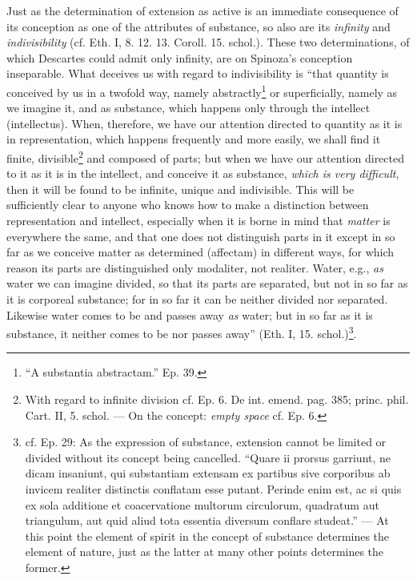 \documentclass[12pt,a4paper,openany]{book}
\newcommand{\opage}[1]{\marginnote{\footnotesize\textit{[#1]}}}
\begin{document}
\opage{75}\setcounter{footnote}{0}Just as the determination of extension as active is an immediate
consequence of its conception as one of the attributes of substance,
so also are its \emph{infinity} and \emph{indivisibility} (cf. Eth. I, 8.
12. 13. Coroll. 15. schol.). These two determinations, of which
Descartes could admit only infinity, are on Spinoza's
conception inseparable. What deceives us with regard to indivisibility
is ``that quantity is conceived by us in a twofold
way, namely abstractly\footnote{``A substantia abstractam.'' Ep.
39.} or superficially, namely as we imagine it, and
as substance, which happens only through the intellect (intellectus).
When, therefore, we have our attention directed to quantity
as it is in representation, which happens frequently and
more easily, we shall find it finite, divisible\footnote{With
regard to infinite division cf. Ep. 6. De int. emend. pag.
385; princ. phil. Cart. II, 5. schol. --- On the concept: \emph{empty
space} cf. Ep. 6.} and composed of parts; but when we have
our attention directed to it as it is in the intellect,
and conceive it as substance, \emph{which is very difficult}, then
it will be found to be infinite, unique and indivisible. This will
be sufficiently clear to anyone who knows how to make a
distinction between representation and intellect, especially when it is
borne in mind that \emph{matter} is everywhere the same, and that one does not
distinguish parts in it except in so far as we conceive matter
as determined (affectam) in different ways, for which reason its parts
are distinguished only modaliter, not realiter. Water, e.g., \emph{as} water
we can imagine divided, so that its parts are separated,
but not in so far as it is corporeal substance; for
in so far it can be neither divided nor separated. Likewise
water comes to be and passes away \emph{as} water; but in so far as it is
substance, it neither comes to be nor passes away'' (Eth. I, 15.
schol.)\footnote{cf. Ep. 29: As the expression of substance,
extension cannot be limited or divided without its concept
being cancelled. ``Quare ii prorsus garriunt, ne dicam insaniunt, qui
substantiam extensam ex partibus sive corporibus ab invicem
realiter distinctis conflatam esse putant. Perinde enim est, ac
si quis ex sola additione et coacervatione multorum circulorum,
quadratum aut triangulum, aut quid aliud tota essentia diversum
conflare studeat.'' --- At this point the element of spirit
in the concept of substance determines the element of nature, just as the latter at many
other points determines the former.
}.
\end{document}
